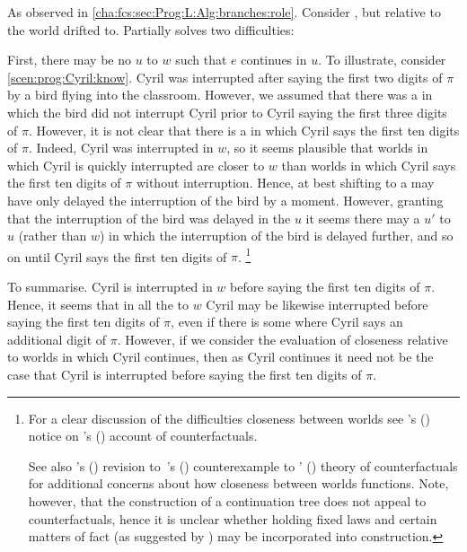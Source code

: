\begin{note}
  As observed in \autoref{cha:fcs:sec:Prog:L:Alg:branches:role}.
  Consider , but  relative to the world drifted to.
  Partially solves two difficulties:

  First, there may be no  \(u\) to \(w\) such that \(e\) continues in \(u\).
  To illustrate, consider \autoref{scen:prog:Cyril:know}.
  Cyril was interrupted after saying the first two digits of \(\pi\) by a bird flying into the classroom.
  However, we assumed that there was a  in which the bird did not interrupt Cyril prior to Cyril saying the first three digits of \(\pi\).
  However, it is not clear that there is a  in which Cyril says the first ten digits of \(\pi\).
  Indeed, Cyril was interrupted in \(w\), so it seems plausible that worlds in which Cyril is quickly interrupted are closer to \(w\) than worlds in which Cyril says the first ten digits of \(\pi\) without interruption.
  Hence, at best shifting to a  may have only delayed the interruption of the bird by a moment.
  However, granting that the interruption of the bird was delayed in the  \(u\) it seems there may a  \(u'\) to \(u\) (rather than \(w\)) in which the interruption of the bird is delayed further, and so on until Cyril says the first ten digits of \(\pi\).%
  \footnote{
    For a clear discussion of the difficulties closeness between worlds see \citeauthor{Fine:1975tj}'s (\citeyear{Fine:1975tj}) notice on \citeauthor{Lewis:1973th}'s (\citeyear{Lewis:1973th}) account of counterfactuals.

    See also \citeauthor{Veltman:2005tj}'s (\citeyear{Veltman:2005tj}) revision to~\citeauthor{Tichy:1976tp}'s (\citeyear{Tichy:1976tp}) counterexample to \citeauthor{Lewis:1979vm}' (\citeyear{Lewis:1973th,Lewis:1979vm}) theory of counterfactuals for additional concerns about how closeness between worlds functions.
    Note, however, that the construction of a continuation tree does not appeal to counterfactuals, hence it is unclear whether holding  fixed laws and certain matters of fact (as suggested by \citeauthor{Veltman:2005tj}) may be incorporated into construction.
  }

  To summarise.
  Cyril is interrupted in \(w\) before saying the first ten digits of \(\pi\).
  Hence, it seems that in all the  to \(w\) Cyril may be likewise interrupted before saying the first ten digits of \(\pi\), even if there is some \closeW{} where Cyril says an additional digit of \(\pi\).
  However, if we consider the evaluation of closeness relative to worlds in which Cyril continues, then as Cyril continues it need not be the case that Cyril is interrupted before saying the first ten digits of \(\pi\).
\end{note}

